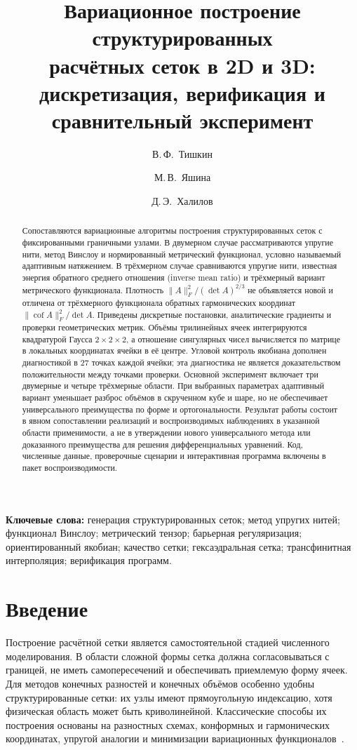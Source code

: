 \documentclass[11pt,a4paper]{article}
\title{\textbf{Вариационное построение структурированных\\
расчётных сеток в 2D и 3D:\\
дискретизация, верификация и сравнительный эксперимент}}
\author{В.\,Ф.~Тишкин \and М.\,В.~Яшина \and Д.\,Э.~Халилов}
\date{}
\begin{document}
\maketitle

\begin{abstract}
Сопоставляются вариационные алгоритмы построения структурированных сеток
с фиксированными граничными узлами. В двумерном случае рассматриваются
упругие нити, метод Винслоу и нормированный метрический функционал,
условно называемый адаптивным натяжением. В трёхмерном случае сравниваются
упругие нити, известная энергия обратного среднего отношения (inverse
mean ratio) и трёхмерный вариант метрического функционала. Плотность
$\|A\|_F^2/(\det A)^{2/3}$ не объявляется новой и отличена от
трёхмерного функционала обратных гармонических координат
$\|\operatorname{cof} A\|_F^2/\det A$.
Приведены дискретные постановки, аналитические градиенты и проверки
геометрических метрик. Объёмы трилинейных ячеек интегрируются квадратурой
Гаусса $2\times2\times2$, а отношение сингулярных чисел вычисляется по
матрице в локальных координатах ячейки в её центре. Угловой контроль
якобиана дополнен диагностикой в 27 точках каждой ячейки; эта диагностика
не является доказательством положительности между точками проверки.
Основной эксперимент включает три двумерные и четыре трёхмерные области.
При выбранных параметрах адаптивный вариант уменьшает разброс объёмов
в скрученном кубе и шаре, но не обеспечивает универсального преимущества
по форме и ортогональности. Результат работы состоит в явном сопоставлении
реализаций и воспроизводимых наблюдениях в указанной области применимости,
а не в утверждении нового универсального метода или доказанного преимущества
для решения дифференциальных уравнений. Код, численные данные, проверочные
сценарии и интерактивная программа включены в пакет воспроизводимости.
\end{abstract}

\begin{small}
\noindent\textbf{Ключевые слова:}
генерация структурированных сеток; метод упругих нитей; функционал
Винслоу; метрический тензор; барьерная регуляризация; ориентированный
якобиан; качество сетки; гексаэдральная сетка; трансфинитная
интерполяция; верификация программ.
\end{small}

\section{Введение}

Построение расчётной сетки является самостоятельной стадией численного
моделирования. В области сложной формы сетка должна согласовываться с
границей, не иметь самопересечений и обеспечивать приемлемую форму ячеек.
Для методов конечных разностей и конечных объёмов особенно удобны
структурированные сетки: их узлы имеют прямоугольную индексацию, хотя
физическая область может быть криволинейной. Классические способы их
построения основаны на разностных схемах, конформных и гармонических
координатах, упругой аналогии и минимизации вариационных
функционалов~\cite{samarskii1989,godunov1967,winslow1966,thompson1985}.
\end{document}
